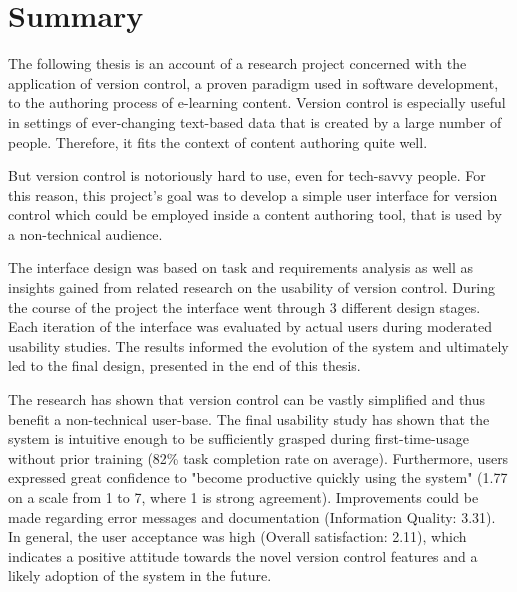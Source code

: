 \chapter{Summary}
\pagestyle{headings}

The following thesis is an account of a research project concerned with the application of version control, a proven paradigm used in software development, to the authoring process of e-learning content. Version control is especially useful in settings of ever-changing text-based data that is created by a large number of people. Therefore, it fits the context of content authoring quite well.

But version control is notoriously hard to use, even for tech-savvy people. For this reason, this project's goal was to develop a simple user interface for version control which could be employed inside a content authoring tool, that is used by a non-technical audience.

The interface design was based on task and requirements analysis as well as insights gained from related research on the usability of version control. During the course of the project the interface went through 3 different design stages. Each iteration of the interface was evaluated by actual users during moderated usability studies. The results informed the evolution of the system and ultimately led to the final design, presented in the end of this thesis.

The research has shown that version control can be vastly simplified and thus benefit a non-technical user-base. The final usability study has shown that the system is intuitive enough to be sufficiently grasped during first-time-usage without prior training (82\% task completion rate on average). Furthermore, users expressed great confidence to "become productive quickly using the system" (1.77 on a scale from 1 to 7, where 1 is strong agreement). Improvements could be made regarding error messages and documentation (Information Quality: 3.31). In general, the user acceptance was high (Overall satisfaction: 2.11), which indicates a positive attitude towards the novel version control features and a likely adoption of the system in the future.

